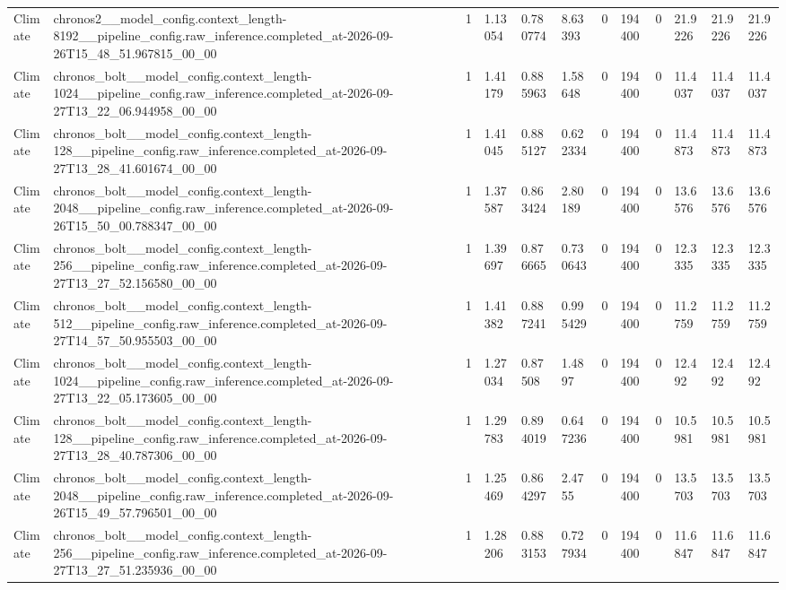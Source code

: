 \begin{tabular}{llllllllllll}
Climate & chronos2\_\_model\_config.context\_length-8192\_\_pipeline\_config.raw\_inference.completed\_at-2026-09-26T15\_48\_51.967815\_00\_00 & 1 & 1.13054 & 0.780774 & 8.63393 & 0 & 194400 & 0 & 21.9226 & 21.9226 & 21.9226 \\
Climate & chronos\_bolt\_\_model\_config.context\_length-1024\_\_pipeline\_config.raw\_inference.completed\_at-2026-09-27T13\_22\_06.944958\_00\_00 & 1 & 1.41179 & 0.885963 & 1.58648 & 0 & 194400 & 0 & 11.4037 & 11.4037 & 11.4037 \\
Climate & chronos\_bolt\_\_model\_config.context\_length-128\_\_pipeline\_config.raw\_inference.completed\_at-2026-09-27T13\_28\_41.601674\_00\_00 & 1 & 1.41045 & 0.885127 & 0.622334 & 0 & 194400 & 0 & 11.4873 & 11.4873 & 11.4873 \\
Climate & chronos\_bolt\_\_model\_config.context\_length-2048\_\_pipeline\_config.raw\_inference.completed\_at-2026-09-26T15\_50\_00.788347\_00\_00 & 1 & 1.37587 & 0.863424 & 2.80189 & 0 & 194400 & 0 & 13.6576 & 13.6576 & 13.6576 \\
Climate & chronos\_bolt\_\_model\_config.context\_length-256\_\_pipeline\_config.raw\_inference.completed\_at-2026-09-27T13\_27\_52.156580\_00\_00 & 1 & 1.39697 & 0.876665 & 0.730643 & 0 & 194400 & 0 & 12.3335 & 12.3335 & 12.3335 \\
Climate & chronos\_bolt\_\_model\_config.context\_length-512\_\_pipeline\_config.raw\_inference.completed\_at-2026-09-27T14\_57\_50.955503\_00\_00 & 1 & 1.41382 & 0.887241 & 0.995429 & 0 & 194400 & 0 & 11.2759 & 11.2759 & 11.2759 \\
Climate & chronos\_bolt\_\_model\_config.context\_length-1024\_\_pipeline\_config.raw\_inference.completed\_at-2026-09-27T13\_22\_05.173605\_00\_00 & 1 & 1.27034 & 0.87508 & 1.4897 & 0 & 194400 & 0 & 12.492 & 12.492 & 12.492 \\
Climate & chronos\_bolt\_\_model\_config.context\_length-128\_\_pipeline\_config.raw\_inference.completed\_at-2026-09-27T13\_28\_40.787306\_00\_00 & 1 & 1.29783 & 0.894019 & 0.647236 & 0 & 194400 & 0 & 10.5981 & 10.5981 & 10.5981 \\
Climate & chronos\_bolt\_\_model\_config.context\_length-2048\_\_pipeline\_config.raw\_inference.completed\_at-2026-09-26T15\_49\_57.796501\_00\_00 & 1 & 1.25469 & 0.864297 & 2.4755 & 0 & 194400 & 0 & 13.5703 & 13.5703 & 13.5703 \\
Climate & chronos\_bolt\_\_model\_config.context\_length-256\_\_pipeline\_config.raw\_inference.completed\_at-2026-09-27T13\_27\_51.235936\_00\_00 & 1 & 1.28206 & 0.883153 & 0.727934 & 0 & 194400 & 0 & 11.6847 & 11.6847 & 11.6847 \\

\end{tabular}
